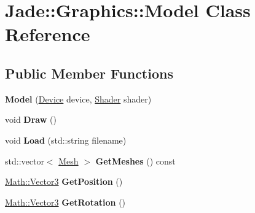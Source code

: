 \hypertarget{class_jade_1_1_graphics_1_1_model}{}\section{Jade\+:\+:Graphics\+:\+:Model Class Reference}
\label{class_jade_1_1_graphics_1_1_model}
\subsection*{Public Member Functions}
\begin{DoxyCompactItemize}
\item 
\hypertarget{class_jade_1_1_graphics_1_1_model_aced4941b6d6603afb6cbbda7d27f7493}{}{\bfseries Model} (\hyperlink{class_jade_1_1_graphics_1_1_device}{Device} device, \hyperlink{class_jade_1_1_graphics_1_1_shader}{Shader} shader)\label{class_jade_1_1_graphics_1_1_model_aced4941b6d6603afb6cbbda7d27f7493}

\item 
\hypertarget{class_jade_1_1_graphics_1_1_model_a1029b2a86cb0e2c075d30cba6df224ea}{}void {\bfseries Draw} ()\label{class_jade_1_1_graphics_1_1_model_a1029b2a86cb0e2c075d30cba6df224ea}

\item 
\hypertarget{class_jade_1_1_graphics_1_1_model_af810f04f7191f97267b43c42a9dbb1f6}{}void {\bfseries Load} (std\+::string filename)\label{class_jade_1_1_graphics_1_1_model_af810f04f7191f97267b43c42a9dbb1f6}

\item 
\hypertarget{class_jade_1_1_graphics_1_1_model_a0d85e89daa0e6f60bc16db7dbf045ce2}{}std\+::vector$<$ \hyperlink{class_jade_1_1_graphics_1_1_mesh}{Mesh} $>$ {\bfseries Get\+Meshes} () const \label{class_jade_1_1_graphics_1_1_model_a0d85e89daa0e6f60bc16db7dbf045ce2}

\item 
\hypertarget{class_jade_1_1_graphics_1_1_model_a4c59aa925bb09947953db8df2f10753d}{}\hyperlink{struct_jade_1_1_math_1_1_vector3}{Math\+::\+Vector3} {\bfseries Get\+Position} ()\label{class_jade_1_1_graphics_1_1_model_a4c59aa925bb09947953db8df2f10753d}

\item 
\hypertarget{class_jade_1_1_graphics_1_1_model_ad5326c7e5a30a417f8523c0fe3475291}{}\hyperlink{struct_jade_1_1_math_1_1_vector3}{Math\+::\+Vector3} {\bfseries Get\+Rotation} ()\label{class_jade_1_1_graphics_1_1_model_ad5326c7e5a30a417f8523c0fe3475291}


\end{DoxyCompactItemize}
